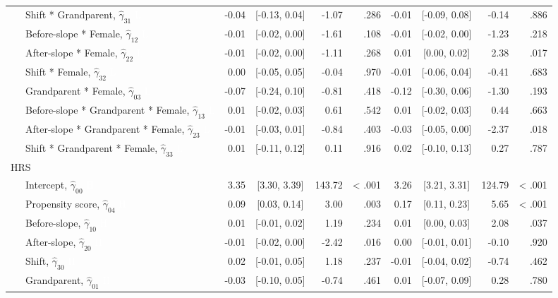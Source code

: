 \documentclass[
  english,
  man, noextraspace]{apa7}
\newenvironment{lltable}{\begin{landscape}\begin{center}\begin{ThreePartTable}}{\end{ThreePartTable}\end{center}\end{landscape}}
\begin{document}
\begin{appendix}
\begin{lltable}
{\begin{longtable}{lrcrrrcrr}
\ \ \ Shift * Grandparent, $\hat{\gamma}_{31}$ \textcolor{white}{L} & -0.04 & [-0.13, 0.04] & -1.07 & .286 & -0.01 & [-0.09, 0.08] & -0.14 & .886\\
\ \ \ Before-slope * Female, $\hat{\gamma}_{12}$ \textcolor{white}{L} & -0.01 & [-0.02, 0.00] & -1.61 & .108 & -0.01 & [-0.02, 0.00] & -1.23 & .218\\
\ \ \ After-slope * Female, $\hat{\gamma}_{22}$ \textcolor{white}{L} & -0.01 & [-0.02, 0.00] & -1.11 & .268 & 0.01 & [0.00, 0.02] & 2.38 & .017\\
\ \ \ Shift * Female, $\hat{\gamma}_{32}$ \textcolor{white}{L} & 0.00 & [-0.05, 0.05] & -0.04 & .970 & -0.01 & [-0.06, 0.04] & -0.41 & .683\\
\ \ \ Grandparent * Female, $\hat{\gamma}_{03}$ \textcolor{white}{L} & -0.07 & [-0.24, 0.10] & -0.81 & .418 & -0.12 & [-0.30, 0.06] & -1.30 & .193\\
\ \ \ Before-slope * Grandparent * Female, $\hat{\gamma}_{13}$ \textcolor{white}{L} & 0.01 & [-0.02, 0.03] & 0.61 & .542 & 0.01 & [-0.02, 0.03] & 0.44 & .663\\
\ \ \ After-slope * Grandparent * Female, $\hat{\gamma}_{23}$ \textcolor{white}{L} & -0.01 & [-0.03, 0.01] & -0.84 & .403 & -0.03 & [-0.05, 0.00] & -2.37 & .018\\
\ \ \ Shift * Grandparent * Female, $\hat{\gamma}_{33}$ \textcolor{white}{L} & 0.01 & [-0.11, 0.12] & 0.11 & .916 & 0.02 & [-0.10, 0.13] & 0.27 & .787\\
HRS &  &  &  &  &  &  &  & \\
\ \ \ Intercept, $\hat{\gamma}_{00}$ \textcolor{white}{H} & 3.35 & [3.30, 3.39] & 143.72 & < .001 & 3.26 & [3.21, 3.31] & 124.79 & < .001\\
\ \ \ Propensity score, $\hat{\gamma}_{04}$ \textcolor{white}{H} & 0.09 & [0.03, 0.14] & 3.00 & .003 & 0.17 & [0.11, 0.23] & 5.65 & < .001\\
\ \ \ Before-slope, $\hat{\gamma}_{10}$ \textcolor{white}{H} & 0.01 & [-0.01, 0.02] & 1.19 & .234 & 0.01 & [0.00, 0.03] & 2.08 & .037\\
\ \ \ After-slope, $\hat{\gamma}_{20}$ \textcolor{white}{H} & -0.01 & [-0.02, 0.00] & -2.42 & .016 & 0.00 & [-0.01, 0.01] & -0.10 & .920\\
\ \ \ Shift, $\hat{\gamma}_{30}$ \textcolor{white}{H} & 0.02 & [-0.01, 0.05] & 1.18 & .237 & -0.01 & [-0.04, 0.02] & -0.74 & .462\\
\ \ \ Grandparent, $\hat{\gamma}_{01}$ \textcolor{white}{H} & -0.03 & [-0.10, 0.05] & -0.74 & .461 & 0.01 & [-0.07, 0.09] & 0.28 & .780\\

\end{longtable}}
\end{lltable}
\end{appendix}
\end{document}
